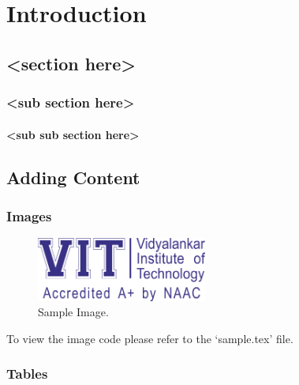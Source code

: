 \chapter{Introduction}

\section{<section here>}

\subsection{<sub section here>}

\blindtext

\subsubsection{<sub sub section here>}

\blindtext


\section{Adding Content}

\subsection{Images}

\begin{figure}[ht]
    \begin{center}
        \includegraphics[width=0.50\textwidth]{./vit-logo.png}
        \caption{Sample Image.}
        \label{fig:sample-image}
    \end{center}
\end{figure}

\noindent To view the image code please refer to the `sample.tex' file.

\subsection{Tables}

